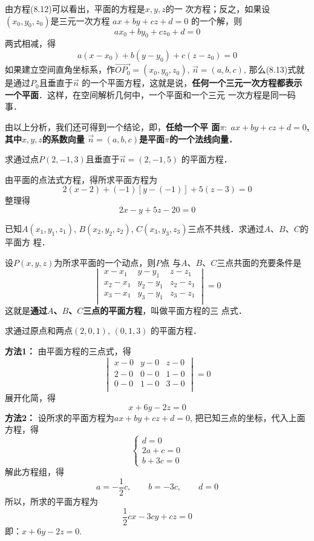 由方程(8.12)可以看出，平面的方程是$x,y,z$的一
次方程；反之，如果设$(x_0,y_0,z_0)$是三元一次方程
$ax+by+cz+d=0$
的一个解，则
\[ax_0+by_0+cz_0+d=0\]
两式相减，得
\begin{equation}
    a(x-x_0)+b(y-y_0)+c(z-z_0)=0
\end{equation}
如果建立空间直角坐标系，作$\Vec{OP_0}=(x_0,y_0,z_0)$,
 $\vec{n}=(a,b,c)$, 那么(8.13)式就是通过$P_0$且垂直于$\vec{n}$
的一个平面方程，这就是说，\textbf{任何一个三元一次方程都表示
一个平面}．这样，在空间解析几何中，一个平面和一个三元
一次方程是同一码事．

由以上分析，我们还可得到一个结论，即，\textbf{任给一个平
面$\pi:\; ax+by+cz+d=0$, 其中$x,y,z$的系数向量  
$\vec{n}=(a,b,c)$是平面$\pi$的一个法线向量．
}

\begin{example}
    求通过点$P(2,-1,3)$且垂直于$\vec{n}=(2,-1,5)$
的平面方程．
\end{example}

\begin{solution}
    由平面的点法式方程，得所求平面方程为
\[2(x-2)+(-1)[y-(-1)]+5(z-3)=0\]
整理得
\[2x-y+5z-20=0\]
\end{solution}




\begin{example}
    已知$A(x_1,y_1,z_1)$, $B(x_2,y_2,z_2)$, 
$C(x_3,y_3,z_3)$三点不共线．求通过$A$、$B$、$C$的平面方
程．
\end{example}

\begin{solution}
    设$P(x,y,z)$为所求平面的一个动点，则$P$点
与$A$、$B$、$C$三点共面的充要条件是
\[\begin{vmatrix}
    x-x_1&y-y_1&z-z_1\\
    x_2-x_1&y_2-y_1&z_2-z_1\\
    x_3-x_1&y_3-y_1&z_3-z_1\\
\end{vmatrix}=0\]
这就是\textbf{通过$A$、$B$、$C$三点的平面方程}，叫做平面方程的三
点式．
\end{solution}




\begin{example}
    求通过原点和两点$(2,0,1)$, $(0,1,3)$
的平面方程．
\end{example}

\begin{solution}
\textbf{方法1：} 由平面方程的三点式，得
\[\begin{vmatrix}
x-0&y-0&z-0\\    
2-0&0-0&1-0\\ 
0-0&1-0&3-0\\ 
\end{vmatrix}=0\]
展开化简，得
\[x+6y-2z=0\]
\textbf{方法2：}
设所求的平面方程为$ax+by+cz+d=0$, 
把已知三点的坐标，代入上面方程，得
\[\begin{cases}
    d=0\\
    2a+c=0\\
    b+3c=0
\end{cases}\]
解此方程组，得
\[a=-\frac{1}{2}c,\qquad b=-3c,\qquad d=0\]
所以，所求的平面方程为
\[\frac{1}{2}cx-3cy+cz=0\]
即：$x+6y-2z=0$.
\end{solution}

